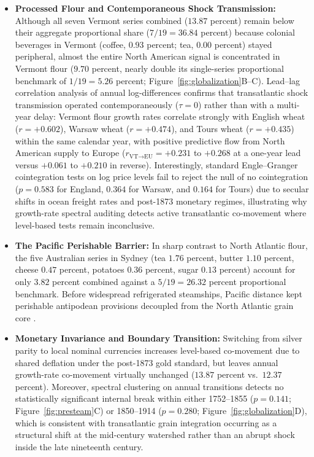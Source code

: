 \documentclass{article}
\begin{document}
\begin{itemize}
\item \textbf{Processed Flour and Contemporaneous Shock Transmission:} Although all seven Vermont series combined ($13.87$ percent) remain below their aggregate proportional share ($7/19 = 36.84$ percent) because colonial beverages in Vermont (coffee, $0.93$ percent; tea, $0.00$ percent) stayed peripheral, almost the entire North American signal is concentrated in Vermont flour ($9.70$ percent, nearly double its single-series proportional benchmark of $1/19 = 5.26$ percent; Figure~\ref{fig:globalization}B--C). Lead--lag correlation analysis of annual log-differences confirms that transatlantic shock transmission operated contemporaneously ($\tau = 0$) rather than with a multi-year delay: Vermont flour growth rates correlate strongly with English wheat ($r = +0.602$), Warsaw wheat ($r = +0.474$), and Tours wheat ($r = +0.435$) within the same calendar year, with positive predictive flow from North American supply to Europe ($r_{\text{VT}\to\text{EU}} = +0.231$ to $+0.268$ at a one-year lead versus $+0.061$ to $+0.210$ in reverse). Interestingly, standard Engle--Granger cointegration tests \cite{engle1987} on log price levels fail to reject the null of no cointegration ($p = 0.583$ for England, $0.364$ for Warsaw, and $0.164$ for Tours) due to secular shifts in ocean freight rates and post-1873 monetary regimes, illustrating why growth-rate spectral auditing detects active transatlantic co-movement where level-based tests remain inconclusive.
\item \textbf{The Pacific Perishable Barrier:} In sharp contrast to North Atlantic flour, the five Australian series in Sydney (tea $1.76$ percent, butter $1.10$ percent, cheese $0.47$ percent, potatoes $0.36$ percent, sugar $0.13$ percent) account for only $3.82$ percent combined against a $5/19 = 26.32$ percent proportional benchmark. Before widespread refrigerated steamships, Pacific distance kept perishable antipodean provisions decoupled from the North Atlantic grain core \cite{jacks2011}.
\item \textbf{Monetary Invariance and Boundary Transition:} Switching from silver parity to local nominal currencies increases level-based co-movement due to shared deflation under the post-1873 gold standard, but leaves annual growth-rate co-movement virtually unchanged ($13.87$ percent vs.\ $12.37$ percent). Moreover, spectral clustering on annual transitions detects no statistically significant internal break within either 1752--1855 ($p=0.141$; Figure~\ref{fig:presteam}C) or 1850--1914 ($p=0.280$; Figure~\ref{fig:globalization}D), which is consistent with transatlantic grain integration occurring as a structural shift at the mid-century watershed rather than an abrupt shock inside the late nineteenth century.
\end{itemize}
\end{document}
